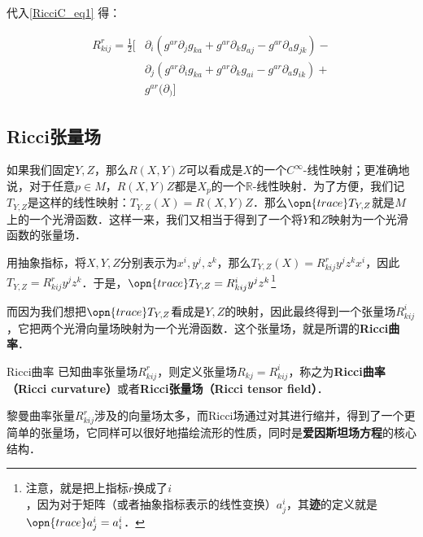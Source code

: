 代入\autoref{RicciC_eq1} 得：

\begin{equation}
\begin{aligned}
R^r_{kij}=\frac{1}{2}[&\partial_i(g^{ar}\partial_jg_{ka}+g^{ar}\partial_kg_{aj}-g^{ar}\partial_ag_{jk})-\\
&\partial_j(g^{ar}\partial_ig_{ka}+g^{ar}\partial_kg_{ai}-g^{ar}\partial_ag_{ik})+\\
&g^{ar}(\partial_)]
\end{aligned}
\end{equation}

















\subsection{Ricci张量场}

如果我们固定$Y, Z$，那么$R(X, Y)Z$可以看成是$X$的一个$C^{\infty}$-线性映射；更准确地说，对于任意$p\in M$，$R(X, Y)Z$都是$X_p$的一个$\mathbb{R}$-线性映射．为了方便，我们记$T_{Y, Z}$是这样的线性映射：$T_{Y, Z}(X)=R(X, Y)Z$．那么$\opn{trace}T_{Y, Z}$就是$M$上的一个光滑函数．这样一来，我们又相当于得到了一个将$Y$和$Z$映射为一个光滑函数的张量场．

用抽象指标，将$X, Y, Z$分别表示为$x^i, y^j, z^k$，那么$T_{Y, Z}(X)=R^r_{kij}y^jz^kx^i$，因此$T_{Y, Z}=R^r_{kij}y^jz^k$．于是，$\opn{trace}T_{Y, Z}=R^i_{kij}y^jz^k$\footnote{注意，就是把上指标$r$换成了$i$，因为对于矩阵（或者抽象指标表示的线性变换）$a^i_j$，其\textbf{迹}的定义就是$\opn{trace}a^i_j=a^i_i$．}

而因为我们想把$\opn{trace}T_{Y, Z}$看成是$Y, Z$的映射，因此最终得到一个张量场$R^i_{kij}$，它把两个光滑向量场映射为一个光滑函数．这个张量场，就是所谓的\textbf{Ricci曲率}．

\begin{definition}{Ricci曲率}
已知曲率张量场$R^r_{kij}$，则定义张量场$R_{kj}=R^i_{kij}$，称之为\textbf{Ricci曲率（Ricci curvature）}或者\textbf{Ricci张量场（Ricci tensor field）}．
\end{definition}

黎曼曲率张量$R^r_{kij}$涉及的向量场太多，而Ricci场通过对其进行缩并，得到了一个更简单的张量场，它同样可以很好地描绘流形的性质，同时是\textbf{爱因斯坦场方程}的核心结构．

